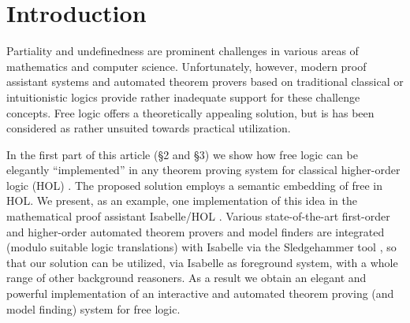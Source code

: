 \section{Introduction}
\label{intro}
Partiality and undefinedness are prominent challenges in various areas
of mathematics and computer science.  Unfortunately, however, modern
proof assistant systems and automated theorem provers based on
traditional classical or intuitionistic logics provide rather
inadequate support for these challenge concepts.  Free logic \cite{Lambert60,Scott67,lambert02:_free_logic,sep-logic-free} offers a
theoretically appealing solution, but is has been considered as rather
unsuited towards practical utilization.


In the first part of this article (\S2 and \S3) we show how free logic
can be elegantly ``implemented'' in any theorem proving system for
classical higher-order logic (HOL) \cite{B5}. The proposed solution
employs a semantic embedding of free in HOL. We present, as an
example, one implementation of this idea in the mathematical proof
assistant Isabelle/HOL \cite{NPW02}. Various state-of-the-art
first-order and higher-order automated theorem provers and model
finders are integrated (modulo suitable logic translations) with
Isabelle via the Sledgehammer tool \cite{Sledgehammer}, so that our
solution can be utilized, via Isabelle as foreground system, with a
whole range of other background reasoners. As a result we obtain an
elegant and powerful implementation of an interactive and automated
theorem proving (and model finding) system for free logic.





 
